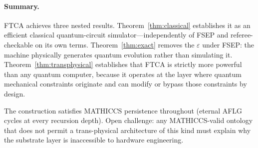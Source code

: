 \documentclass[11pt,letterpaper]{article}
\begin{document}
\paragraph{Summary.}
FTCA achieves three nested results. Theorem~\ref{thm:classical} establishes it as an efficient classical quantum-circuit simulator---independently of FSEP and referee-checkable on its own terms. Theorem~\ref{thm:exact} removes the $\varepsilon$ under FSEP: the machine physically generates quantum evolution rather than simulating it. Theorem~\ref{thm:transphysical} establishes that FTCA is strictly more powerful than any quantum computer, because it operates at the layer where quantum mechanical constraints originate and can modify or bypass those constraints by design.

The construction satisfies MATHICCS persistence throughout (eternal AFLG cycles at every recursion depth). Open challenge: any MATHICCS-valid ontology that does not permit a trans-physical architecture of this kind must explain why the substrate layer is inaccessible to hardware engineering.
\end{document}
